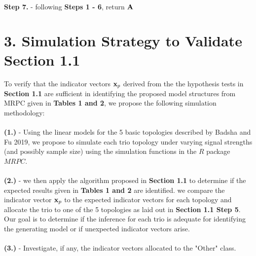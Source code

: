\documentclass[12pt]{report}
\begin{document}
\noindent \textbf{Step 7.} - following \textbf{Steps 1 - 6}, return $\bf A$

\section*{3. Simulation Strategy to Validate Section 1.1}

To verify that the indicator vectors ${\bf x}_p$ derived from the the hypothesis tests in \textbf{Section 1.1} are sufficient in identifying the proposed model structures from MRPC given in \textbf{Tables 1 and 2}, we propose the following simulation methodology: \\
\\

\noindent \textbf{(1.)} - Using the linear models for the 5 basic topologies described by Badsha and Fu 2019, we propose to simulate each trio topology under varying signal strengths (and possibly sample size) using the simulation functions in the $R$ package $MRPC$.\\
\\
\noindent \textbf{(2.)}  - we then apply the algorithm proposed in \textbf{Section 1.1} to determine if the expected results given in \textbf{ Tables 1 and 2} are identified. we compare the indicator vector ${\bf x}_p$ to the expected indicator vectors for each topology and allocate the trio to one of the 5 topologies as laid out in \textbf{Section 1.1 Step 5}. Our goal is to determine if the inference for each trio is adequate for identifying the generating model or if unexpected indicator vectors arise. \\
\\
\textbf{(3.)} - Investigate, if any, the indicator vectors allocated to the "Other" class. 





\newpage
\end{document}

